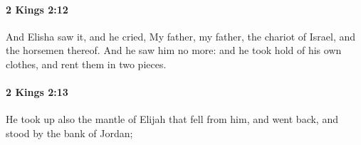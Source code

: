 		\paragraph{2 Kings 2:12} %
			\label{2KINGS-2-12}

			And Elisha saw it, and he cried, My father, my father, the chariot of Israel, and the horsemen thereof. And he saw him no more: and he took hold of his own clothes, and rent them in two pieces.


		\paragraph{2 Kings 2:13} %
			\label{2KINGS-2-13}

			He took up also the mantle of Elijah that fell from him, and went back, and stood by the bank of Jordan;


